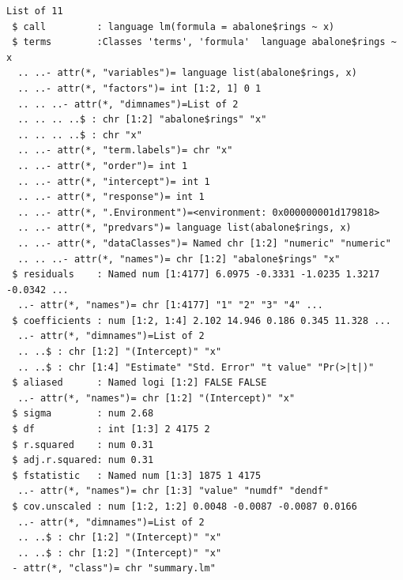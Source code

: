 \documentclass[
  11pt,
]{krantz}
\newenvironment{Shaded}{\begin{snugshade}}{\end{snugshade}}
\newcommand{\CommentTok}[1]{\textcolor[rgb]{0.37,0.37,0.37}{\textit{#1}}}
\newcommand{\ControlFlowTok}[1]{\textcolor[rgb]{0.27,0.27,0.27}{\textbf{#1}}}
\newcommand{\DecValTok}[1]{\textcolor[rgb]{0.06,0.06,0.06}{#1}}
\newcommand{\KeywordTok}[1]{\textcolor[rgb]{0.27,0.27,0.27}{\textbf{#1}}}
\newcommand{\NormalTok}[1]{#1}
\newcommand{\OperatorTok}[1]{\textcolor[rgb]{0.43,0.43,0.43}{\textbf{#1}}}
\newcommand{\StringTok}[1]{\textcolor[rgb]{0.5,0.5,0.5}{#1}}
\begin{document}
\footnotesize

\begin{Shaded}
\end{Shaded}

\begin{verbatim}
List of 11
 $ call         : language lm(formula = abalone$rings ~ x)
 $ terms        :Classes 'terms', 'formula'  language abalone$rings ~ x
  .. ..- attr(*, "variables")= language list(abalone$rings, x)
  .. ..- attr(*, "factors")= int [1:2, 1] 0 1
  .. .. ..- attr(*, "dimnames")=List of 2
  .. .. .. ..$ : chr [1:2] "abalone$rings" "x"
  .. .. .. ..$ : chr "x"
  .. ..- attr(*, "term.labels")= chr "x"
  .. ..- attr(*, "order")= int 1
  .. ..- attr(*, "intercept")= int 1
  .. ..- attr(*, "response")= int 1
  .. ..- attr(*, ".Environment")=<environment: 0x000000001d179818> 
  .. ..- attr(*, "predvars")= language list(abalone$rings, x)
  .. ..- attr(*, "dataClasses")= Named chr [1:2] "numeric" "numeric"
  .. .. ..- attr(*, "names")= chr [1:2] "abalone$rings" "x"
 $ residuals    : Named num [1:4177] 6.0975 -0.3331 -1.0235 1.3217 -0.0342 ...
  ..- attr(*, "names")= chr [1:4177] "1" "2" "3" "4" ...
 $ coefficients : num [1:2, 1:4] 2.102 14.946 0.186 0.345 11.328 ...
  ..- attr(*, "dimnames")=List of 2
  .. ..$ : chr [1:2] "(Intercept)" "x"
  .. ..$ : chr [1:4] "Estimate" "Std. Error" "t value" "Pr(>|t|)"
 $ aliased      : Named logi [1:2] FALSE FALSE
  ..- attr(*, "names")= chr [1:2] "(Intercept)" "x"
 $ sigma        : num 2.68
 $ df           : int [1:3] 2 4175 2
 $ r.squared    : num 0.31
 $ adj.r.squared: num 0.31
 $ fstatistic   : Named num [1:3] 1875 1 4175
  ..- attr(*, "names")= chr [1:3] "value" "numdf" "dendf"
 $ cov.unscaled : num [1:2, 1:2] 0.0048 -0.0087 -0.0087 0.0166
  ..- attr(*, "dimnames")=List of 2
  .. ..$ : chr [1:2] "(Intercept)" "x"
  .. ..$ : chr [1:2] "(Intercept)" "x"
 - attr(*, "class")= chr "summary.lm"
\end{verbatim}
\end{document}
